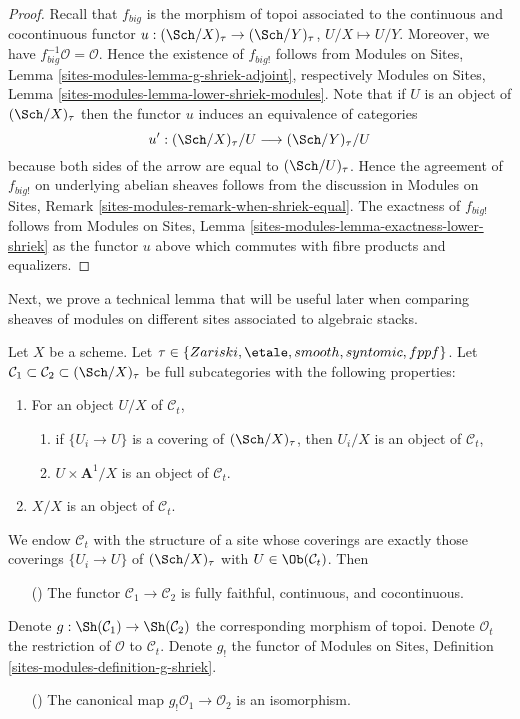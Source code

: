 \begin{proof}
Recall that $f_{big}$ is the morphism of topoi associated to the
continuous and cocontinuous functor
$u : (\Sch/X)_\tau \to (\Sch/Y)_\tau$, $U/X \mapsto U/Y$.
Moreover, we have $f_{big}^{-1}\mathcal{O} = \mathcal{O}$.
Hence the existence of $f_{big!}$ follows from
Modules on Sites, Lemma \ref{sites-modules-lemma-g-shriek-adjoint},
respectively
Modules on Sites, Lemma \ref{sites-modules-lemma-lower-shriek-modules}.
Note that if $U$ is an object of $(\Sch/X)_\tau$ then the functor
$u$ induces an equivalence of categories
$$
u' :
(\Sch/X)_\tau/U
\longrightarrow
(\Sch/Y)_\tau/U
$$
because both sides of the arrow are equal to $(\Sch/U)_\tau$.
Hence the agreement of $f_{big!}$ on underlying abelian sheaves
follows from the discussion in
Modules on Sites, Remark \ref{sites-modules-remark-when-shriek-equal}.
The exactness of $f_{big!}$ follows from
Modules on Sites, Lemma \ref{sites-modules-lemma-exactness-lower-shriek}
as the functor $u$ above which commutes with fibre products and equalizers.
\end{proof}

\noindent
Next, we prove a technical lemma that will be useful later when comparing
sheaves of modules on different sites associated to algebraic stacks.

\begin{lemma}
\label{lemma-compare-structure-sheaves}
Let $X$ be a scheme. Let
$\tau \in \{Zariski, \etale, smooth, syntomic, fppf\}$.
Let $\mathcal{C}_1 \subset \mathcal{C}_2 \subset (\Sch/X)_\tau$ be full
subcategories with the following properties:
\begin{enumerate}
\item For an object $U/X$ of $\mathcal{C}_t$,
\begin{enumerate}
\item if $\{U_i \to U\}$ is a covering of $(\Sch/X)_\tau$, then
$U_i/X$ is an object of $\mathcal{C}_t$,
\item $U \times \mathbf{A}^1/X$ is an object of $\mathcal{C}_t$.
\end{enumerate}
\item $X/X$ is an object of $\mathcal{C}_t$.
\end{enumerate}
We endow $\mathcal{C}_t$ with the structure of a site whose coverings are
exactly those coverings $\{U_i \to U\}$ of $(\Sch/X)_\tau$ with
$U \in \Ob(\mathcal{C}_t)$. Then
\begin{enumerate}
\item[(\romannumeral1)] The functor $\mathcal{C}_1 \to \mathcal{C}_2$
is fully faithful, continuous, and cocontinuous.
\end{enumerate}
Denote $g : \Sh(\mathcal{C}_1) \to \Sh(\mathcal{C}_2)$ the corresponding
morphism of topoi. Denote $\mathcal{O}_t$ the restriction of $\mathcal{O}$
to $\mathcal{C}_t$. Denote $g_!$ the functor of
Modules on Sites, Definition \ref{sites-modules-definition-g-shriek}.
\begin{enumerate}
\item[(\romannumeral2)] The canonical map $g_!\mathcal{O}_1 \to \mathcal{O}_2$
is an isomorphism.
\end{enumerate}
\end{lemma}


